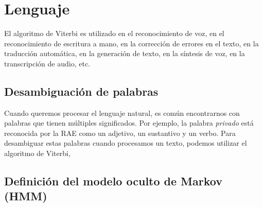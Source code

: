 \documentclass[11pt,openany]{book}
\begin{document}
\section{Lenguaje}
El algoritmo de Viterbi es utilizado en el reconocimiento de voz, en el reconocimiento
de escritura a mano, en la corrección de errores en el texto, en la traducción automática,
en la generación de texto, en la síntesis de voz, en la transcripción de audio, etc. 
\subsection{Desambiguación de palabras}
Cuando queremos procesar el lenguaje natural, es común encontrarnos con palabras que tienen
múltiples significados. Por ejemplo, la palabra \textit{privado} está reconocida por la RAE como 
un adjetivo, un sustantivo y un verbo. Para desambiguar estas palabras cuando procesamos
un texto, podemos utilizar el algoritmo de Viterbi, 
\subsection*{Definición del modelo oculto de Markov (HMM)}
\end{document}
